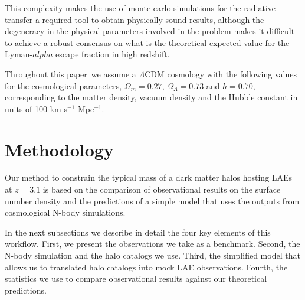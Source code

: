 \documentclass[usenatbib]{mn2e}
\newcommand{\documentname}{paper~}
\begin{document}
This complexity makes the use of monte-carlo simulations for the
radiative transfer a required tool to obtain physically sound results,
although the degeneracy in the physical parameters involved in the
problem makes it difficult to achieve a robust consensus on what is
the theoretical expected value for the Lyman-$alpha$ escape fraction
in high redshift. 


Throughout this \documentname we assume a $\Lambda$CDM cosmology with the
following values for the cosmological parameters, $\Omega_{m}=0.27$,
$\Omega_{\Lambda}=0.73$ and $h=0.70$, corresponding to the matter
density, vacuum density and the Hubble constant in units of 100 km
s$^{-1}$ Mpc$^{-1}$. 

\section{Methodology}

Our method to constrain the typical mass of a dark matter halos
hosting LAEs at $z=3.1$ is based on the comparison of observational
results on the surface number density and the predictions of a simple
model that uses the outputs from cosmological N-body simulations. 

In the next subsections we describe in detail the four key elements of
this workflow. First, we present the observations we take as a
benchmark. Second, the N-body simulation and the halo catalogs we
use. Third, the simplified model that allows us to translated halo
catalogs into mock LAE observations. Fourth, the statistics we use to
compare observational results against our theoretical predictions.



\end{document}
